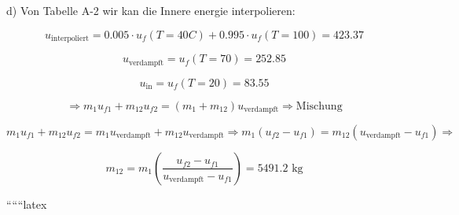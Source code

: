 d) Von Tabelle A-2 wir kan die Innere energie interpolieren:

\[
u_{\text{interpoliert}} = 0.005 \cdot u_f (T=40C) + 0.995 \cdot u_f (T=100) = 423.37
\]


\[
u_{\text{verdampft}} = u_f (T=70) = 252.85
\]

\[
u_{\text{in}} = u_f (T=20) = 83.55
\]

\[
\Rightarrow m_1 u_{f1} + m_{12} u_{f2} = (m_1 + m_{12}) u_{\text{verdampft}} \Rightarrow \text{Mischung}
\]

\[
m_1 u_{f1} + m_{12} u_{f2} = m_1 u_{\text{verdampft}} + m_{12} u_{\text{verdampft}} \Rightarrow m_1 (u_{f2} - u_{f1}) = m_{12} (u_{\text{verdampft}} - u_{f1}) \Rightarrow
\]

\[
m_{12} = m_1 \left( \frac{u_{f2} - u_{f1}}{u_{\text{verdampft}} - u_{f1}} \right) = \boxed{5491.2 \text{ kg}}
\]

``````latex